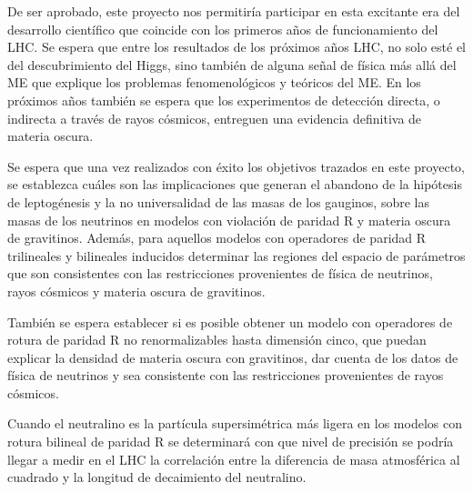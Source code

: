 De ser aprobado, este proyecto nos permitiría participar en esta
excitante era del desarrollo científico que coincide con
los primeros años de funcionamiento del LHC.  Se espera que entre los
resultados de los próximos años LHC, no solo esté el del
descubrimiento del Higgs, sino también de alguna señal de física más
allá del ME que explique los problemas fenomenológicos y
teóricos del ME. En los próximos años también se espera
que los experimentos de detección directa, o indirecta a través de
rayos cósmicos, entreguen una evidencia definitiva de materia oscura.


\begin{gravitinodm}
  Se espera que una vez realizados con éxito los objetivos trazados en
  este proyecto, se establezca cuáles son las implicaciones que
  generan el abandono de la hipótesis de leptogénesis y la no
  universalidad de las masas de los gauginos, sobre las masas de los
  neutrinos en modelos con violación de paridad R y materia oscura de
  gravitinos. Además, para aquellos modelos con operadores de paridad R trilineales
  y bilineales inducidos determinar las regiones del espacio de
  parámetros que son consistentes con las restricciones provenientes
  de física de neutrinos, rayos cósmicos y materia oscura de gravitinos. 
\end{gravitinodm}

\begin{bbrpvlhc}
  También se espera establecer si es posible obtener un modelo con 
  operadores de rotura de paridad R no renormalizables hasta dimensión cinco, que puedan
  explicar la densidad de materia oscura con gravitinos, dar cuenta de
  los datos de física de neutrinos y sea consistente con las
  restricciones provenientes de rayos cósmicos.
\end{bbrpvlhc}

\begin{brpvlhc}
  Cuando el neutralino es la partícula supersimétrica más ligera en los modelos con rotura bilineal de paridad R se determinará con que nivel de precisión se podría llegar a medir en el LHC la correlación entre la diferencia de masa atmosférica al cuadrado y la longitud de decaimiento del neutralino.
\end{brpvlhc}

